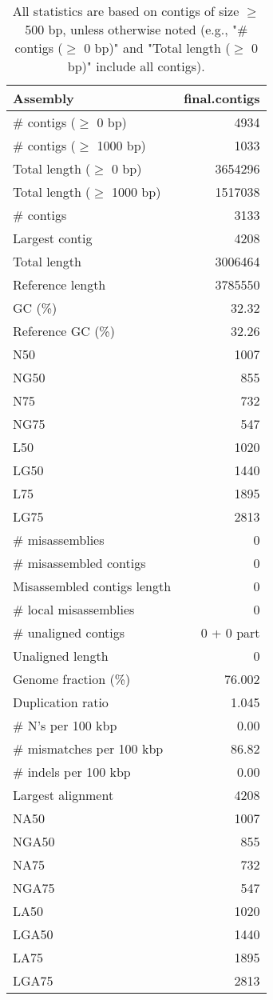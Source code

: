 \documentclass[12pt,a4paper]{article}
\begin{document}
\begin{table}[ht]
\begin{center}
\caption{All statistics are based on contigs of size $\geq$ 500 bp, unless otherwise noted (e.g., "\# contigs ($\geq$ 0 bp)" and "Total length ($\geq$ 0 bp)" include all contigs).}
\begin{tabular}{|l*{1}{|r}|}
\hline
Assembly & final.contigs \\ \hline
\# contigs ($\geq$ 0 bp) & 4934 \\ \hline
\# contigs ($\geq$ 1000 bp) & 1033 \\ \hline
Total length ($\geq$ 0 bp) & 3654296 \\ \hline
Total length ($\geq$ 1000 bp) & 1517038 \\ \hline
\# contigs & 3133 \\ \hline
Largest contig & 4208 \\ \hline
Total length & 3006464 \\ \hline
Reference length & 3785550 \\ \hline
GC (\%) & 32.32 \\ \hline
Reference GC (\%) & 32.26 \\ \hline
N50 & 1007 \\ \hline
NG50 & 855 \\ \hline
N75 & 732 \\ \hline
NG75 & 547 \\ \hline
L50 & 1020 \\ \hline
LG50 & 1440 \\ \hline
L75 & 1895 \\ \hline
LG75 & 2813 \\ \hline
\# misassemblies & 0 \\ \hline
\# misassembled contigs & 0 \\ \hline
Misassembled contigs length & 0 \\ \hline
\# local misassemblies & 0 \\ \hline
\# unaligned contigs & 0 + 0 part \\ \hline
Unaligned length & 0 \\ \hline
Genome fraction (\%) & 76.002 \\ \hline
Duplication ratio & 1.045 \\ \hline
\# N's per 100 kbp & 0.00 \\ \hline
\# mismatches per 100 kbp & 86.82 \\ \hline
\# indels per 100 kbp & 0.00 \\ \hline
Largest alignment & 4208 \\ \hline
NA50 & 1007 \\ \hline
NGA50 & 855 \\ \hline
NA75 & 732 \\ \hline
NGA75 & 547 \\ \hline
LA50 & 1020 \\ \hline
LGA50 & 1440 \\ \hline
LA75 & 1895 \\ \hline
LGA75 & 2813 \\ \hline
\end{tabular}
\end{center}
\end{table}
\end{document}
